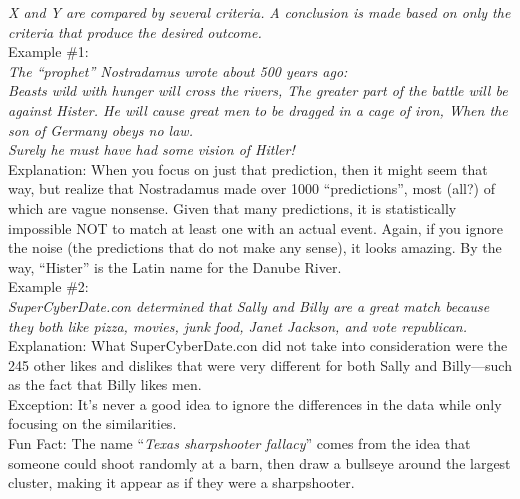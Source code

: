 \documentclass[a4paper,12pt,single,pdftex]{scrbook}
\begin{document}
    
      {\em X and Y are compared by several criteria.} \newline
{\em A conclusion is made based on only the criteria that produce the desired outcome.}
    \\

    
      Example \#1:
    \\

    
      {\em The “prophet” Nostradamus wrote about 500 years ago:}
    \\

    
      {\em Beasts wild with hunger will cross the rivers, \newline
The greater part of the battle will be against Hister. \newline
He will cause great men to be dragged in a cage of iron, \newline
When the son of Germany obeys no law.}
    \\

    
      {\em Surely he must have had some vision of Hitler!}
    \\

    
      Explanation: When you focus on just that prediction, then it might seem that way, but realize that Nostradamus made over 1000 “predictions”, most (all?) of which are vague nonsense.  Given that many predictions, it is statistically impossible NOT to match at least one with an actual event.  Again, if you ignore the noise (the predictions that do not make any sense), it looks amazing.  By the way, “Hister” is the Latin name for the Danube River.
    \\

    
      Example \#2:
    \\

    
      {\em SuperCyberDate.con determined that Sally and Billy are a great match because they both like pizza, movies, junk food, Janet Jackson, and vote republican.}
    \\

    
      Explanation: What SuperCyberDate.con did not take into consideration were the 245 other likes and dislikes that were very different for both Sally and Billy—such as the fact that Billy likes men.
    \\

    
      Exception: It's never a good idea to ignore the differences in the data while only focusing on the similarities.
    \\

    
      Fun Fact: The name “{\em Texas sharpshooter fallacy}” comes from the idea that someone could shoot randomly at a barn, then draw a bullseye around the largest cluster, making it appear as if they were a sharpshooter.
    \\
\end{document}
